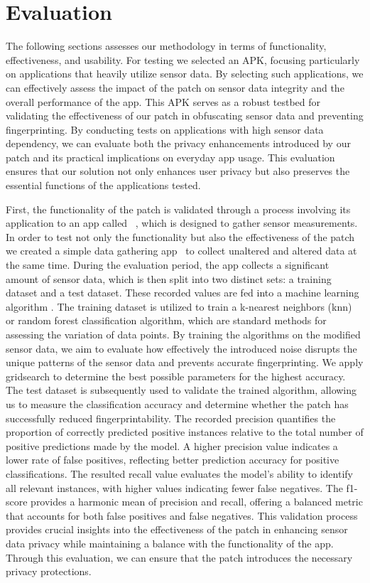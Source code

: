 \documentclass[11pt,
  oneside,openany,    %
]{scrreprt}
\begin{document}
\chapter{Evaluation}
\label{chap:evaluation}
The following sections assesses our methodology in terms of functionality, effectiveness, and usability. 
For testing we selected an APK, focusing particularly on applications that heavily utilize sensor data.
By selecting such applications, we can effectively assess the impact of the patch on sensor data integrity and the overall performance of the app.
This APK serves as a robust testbed for validating the effectiveness of our patch in obfuscating sensor data and preventing fingerprinting.
By conducting tests on applications with high sensor data dependency, we can evaluate both the privacy enhancements introduced by our patch and its practical implications on everyday app usage.
This evaluation ensures that our solution not only enhances user privacy but also preserves the essential functions of the applications tested.

First, the functionality of the patch is validated through a process involving its application to an app called ~\cite{SensorBox}, which is designed to gather sensor measurements.
In order to test not only the functionality but also the effectiveness of the patch we created a simple data gathering app~\cite{sensorprint} to collect unaltered and altered data at the same time. 
During the evaluation period, the app collects a significant amount of sensor data, which is then split into two distinct sets: a training dataset and a test dataset.
These recorded values are fed into a machine learning algorithm \cite{DBLP:journals/tifs/AmeriniBCMN17}.
The training dataset is utilized to train a k-nearest neighbors (knn) or random forest classification algorithm, which are standard methods for assessing the variation of data points.
By training the algorithms on the modified sensor data, we aim to evaluate how effectively the introduced noise disrupts the unique patterns of the sensor data and prevents accurate fingerprinting.
We apply gridsearch to determine the best possible parameters for the highest accuracy.
The test dataset is subsequently used to validate the trained algorithm, allowing us to measure the classification accuracy and determine whether the patch has successfully reduced fingerprintability.
The recorded precision quantifies the proportion of correctly predicted positive instances relative to the total number of positive predictions made by the model.
A higher precision value indicates a lower rate of false positives, reflecting better prediction accuracy for positive classifications.
The resulted recall value evaluates the model's ability to identify all relevant instances, with higher values indicating fewer false negatives.
The f1-score provides a harmonic mean of precision and recall, offering a balanced metric that accounts for both false positives and false negatives.
This validation process provides crucial insights into the effectiveness of the patch in enhancing sensor data privacy while maintaining a balance with the functionality of the app.
Through this evaluation, we can ensure that the patch introduces the necessary privacy protections.
\end{document}
